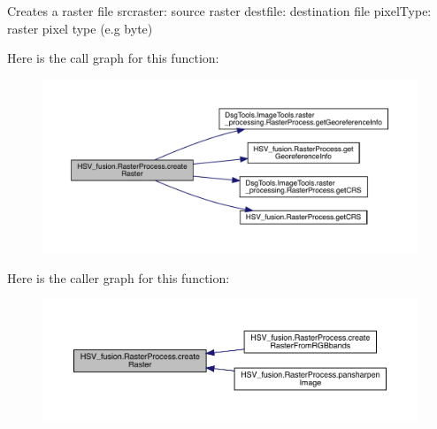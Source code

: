 \begin{DoxyVerb}Creates a raster file
srcraster: source raster
destfile: destination file
pixelType: raster pixel type (e.g byte)
\end{DoxyVerb}
 Here is the call graph for this function\+:
\nopagebreak
\begin{figure}[H]
\begin{center}
\leavevmode
\includegraphics[width=350pt]{class_h_s_v__fusion_1_1_raster_process_a04ccd0a5ef170740489a96842018ec3c_cgraph}
\end{center}
\end{figure}
Here is the caller graph for this function\+:
\nopagebreak
\begin{figure}[H]
\begin{center}
\leavevmode
\includegraphics[width=350pt]{class_h_s_v__fusion_1_1_raster_process_a04ccd0a5ef170740489a96842018ec3c_icgraph}
\end{center}
\end{figure}
\mbox{\label{class_h_s_v__fusion_1_1_raster_process_a50e79f6868107a0c9234edfe7800443e}} 
